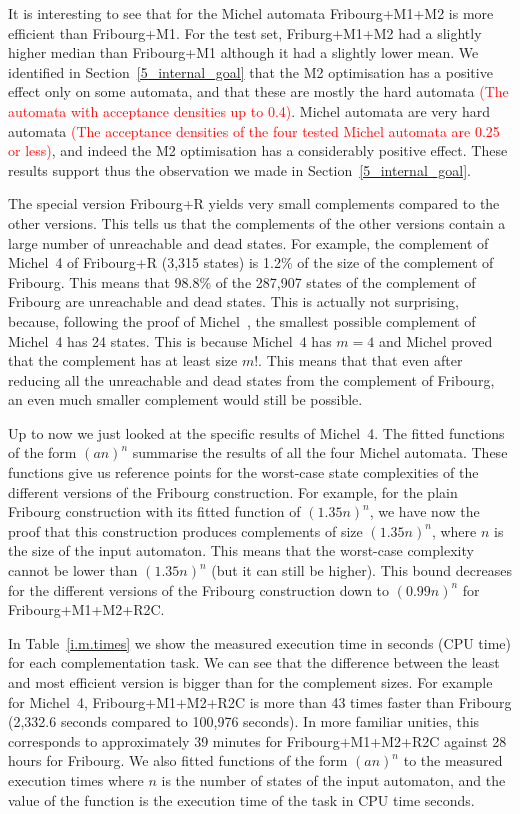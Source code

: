 It is interesting to see that for the Michel automata Fribourg+M1+M2 is more efficient than Fribourg+M1. For the \goal{} test set, Friburg+M1+M2 had a slightly higher median than Fribourg+M1 although it had a slightly lower mean. We identified in Section~\ref{5_internal_goal} that the M2 optimisation has a positive effect only on some automata, and that these are mostly the hard automata \textcolor{red}{(The automata with acceptance densities up to 0.4)}. Michel automata are very hard automata \textcolor{red}{(The acceptance densities of the four tested Michel automata are 0.25 or less)}, and indeed the M2 optimisation has a considerably positive effect. These results support thus the observation we made in Section~\ref{5_internal_goal}.

The special version Fribourg+R yields very small complements compared to the other versions. This tells us that the complements of the other versions contain a large number of unreachable and dead states. For example, the complement of Michel~4 of Fribourg+R (3,315 states) is 1.2\% of the size of the complement of Fribourg. This means that 98.8\% of the 287,907 states of the complement of Fribourg are unreachable and dead states. This is actually not surprising, because, following the proof of Michel~\cite{michel1988}\cite{1996_thomas}, the smallest possible complement of Michel~4 has 24 states. This is because Michel~4 has $m=4$ and Michel proved that the complement has at least size $m!$. This means that that even after reducing all the unreachable and dead states from the complement of Fribourg, an even much smaller complement would still be possible.

Up to now we just looked at the specific results of Michel~4. The fitted functions of the form $(an)^n$ summarise the results of all the four Michel automata. These functions give us reference points for the worst-case state complexities of the different versions of the Fribourg construction. For example, for the plain Fribourg construction with its fitted function of $(1.35n)^n$, we have now the proof that this construction produces complements of size $(1.35n)^n$, where $n$ is the size of the input automaton. This means that the worst-case complexity cannot be lower than $(1.35n)^n$ (but it can still be higher). This bound decreases for the different versions of the Fribourg construction down to $(0.99n)^n$ for Fribourg+M1+M2+R2C.

In Table~\ref{i.m.times} we show the measured execution time in seconds (CPU time) for each complementation task. We can see that the difference between the least and most efficient version is bigger than for the complement sizes. For example for Michel~4, Fribourg+M1+M2+R2C is more than 43 times faster than Fribourg (2,332.6 seconds compared to 100,976 seconds). In more familiar unities, this corresponds to approximately 39 minutes for Fribourg+M1+M2+R2C against 28 hours for Fribourg. We also fitted functions of the form $(an)^n$ to the measured execution times where $n$ is the number of states of the input automaton, and the value of the function is the execution time of the task in CPU time seconds.

